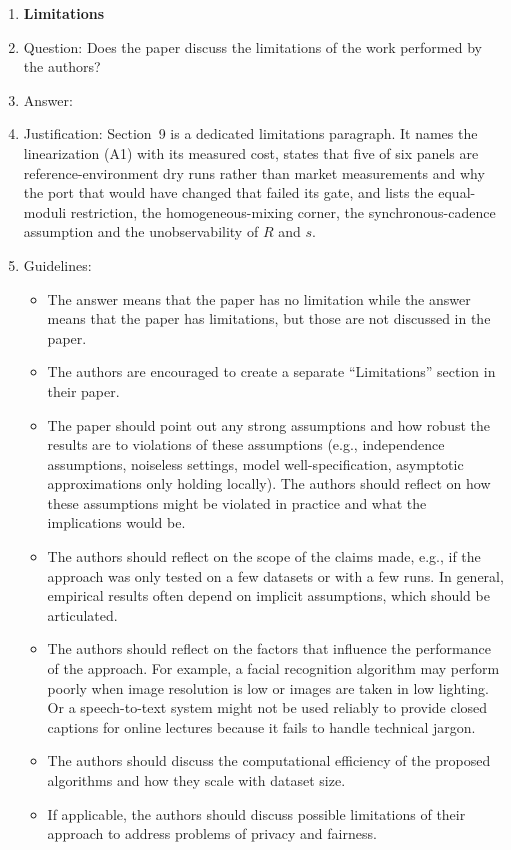 \begin{enumerate}
\item {\bf Limitations}
    \item[] Question: Does the paper discuss the limitations of the work performed by the authors?
    \item[] Answer: \answerYes{}
    \item[] Justification: Section~9 is a dedicated limitations paragraph. It names the linearization (A1) with its measured cost, states that five of six panels are reference-environment dry runs rather than market measurements and why the port that would have changed that failed its gate, and lists the equal-moduli restriction, the homogeneous-mixing corner, the synchronous-cadence assumption and the unobservability of $R$ and $s$.
    \item[] Guidelines:
    \begin{itemize}
        \item The answer \answerNA{} means that the paper has no limitation while the answer \answerNo{} means that the paper has limitations, but those are not discussed in the paper. 
        \item The authors are encouraged to create a separate ``Limitations'' section in their paper.
        \item The paper should point out any strong assumptions and how robust the results are to violations of these assumptions (e.g., independence assumptions, noiseless settings, model well-specification, asymptotic approximations only holding locally). The authors should reflect on how these assumptions might be violated in practice and what the implications would be.
        \item The authors should reflect on the scope of the claims made, e.g., if the approach was only tested on a few datasets or with a few runs. In general, empirical results often depend on implicit assumptions, which should be articulated.
        \item The authors should reflect on the factors that influence the performance of the approach. For example, a facial recognition algorithm may perform poorly when image resolution is low or images are taken in low lighting. Or a speech-to-text system might not be used reliably to provide closed captions for online lectures because it fails to handle technical jargon.
        \item The authors should discuss the computational efficiency of the proposed algorithms and how they scale with dataset size.
        \item If applicable, the authors should discuss possible limitations of their approach to address problems of privacy and fairness.

\end{itemize}
\end{enumerate}
